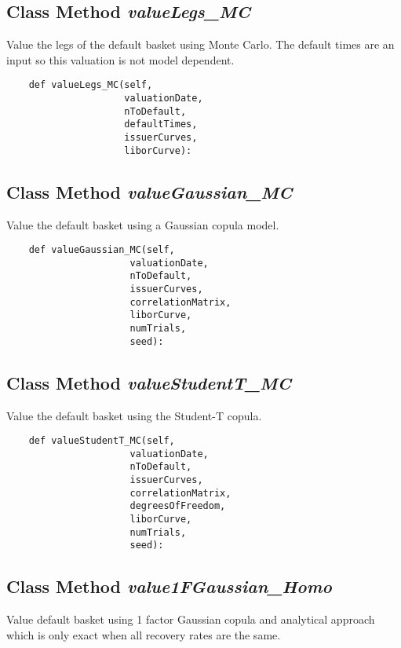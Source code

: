 \documentclass[twoside,11pt]{book}
\begin{document}
\subsection{Class Method {\it valueLegs\_MC}}
Value the legs of the default basket using Monte Carlo. The default times are an input so this valuation is not model dependent. 

\begin{lstlisting}
    def valueLegs_MC(self, 
                     valuationDate,
                     nToDefault,
                     defaultTimes, 
                     issuerCurves,
                     liborCurve):
\end{lstlisting}

\subsection{Class Method {\it valueGaussian\_MC}}
Value the default basket using a Gaussian copula model. 

\begin{lstlisting}
    def valueGaussian_MC(self, 
                      valuationDate,
                      nToDefault,
                      issuerCurves,
                      correlationMatrix,
                      liborCurve,
                      numTrials,
                      seed):
\end{lstlisting}

\subsection{Class Method {\it valueStudentT\_MC}}
Value the default basket using the Student-T copula. 

\begin{lstlisting}
    def valueStudentT_MC(self, 
                      valuationDate,
                      nToDefault,
                      issuerCurves,
                      correlationMatrix,
                      degreesOfFreedom,
                      liborCurve,
                      numTrials,
                      seed):
\end{lstlisting}

\subsection{Class Method {\it value1FGaussian\_Homo}}
Value default basket using 1 factor Gaussian copula and analytical approach which is only exact when all recovery rates are the same. 
\end{document}
